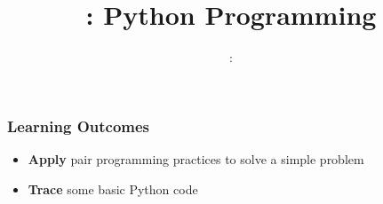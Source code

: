 \usepackage{../../beamerthemeFalmouthGamesAcademy}
\usepackage{multimedia}
\graphicspath{ {../../} }

\usepackage{textcomp}


\usepackage[normalem]{ulem}
\usepackage{wasysym}

\usepackage{pdfpages}

\usetikzlibrary{arrows,automata}







\title{\sessionnumber: Python Programming}
\subtitle{\modulecode: \moduletitle}

\frame{\titlepage} 

\begin{frame}
	\frametitle{Learning Outcomes}
	\begin{itemize}
		\item \textbf{Apply} pair programming practices to solve a simple problem
		\item\textbf{Trace} some basic Python code
	\end{itemize}
\end{frame}







